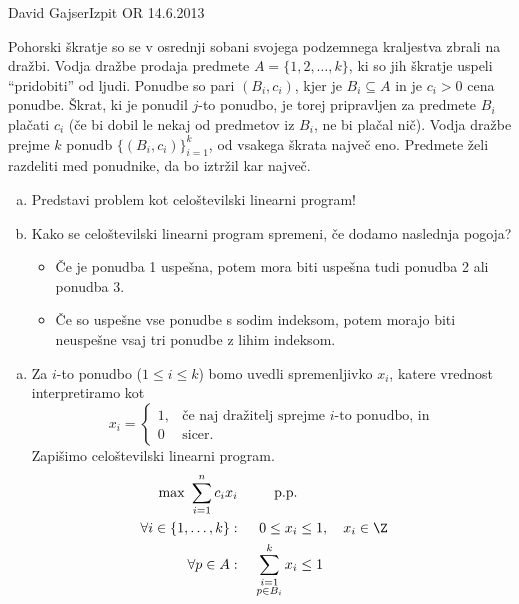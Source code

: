 \begin{naloga}%
{David Gajser}{Izpit OR 14.6.2013}
\begin{vprasanje}
Pohorski škratje so se v osrednji sobani svojega podzemnega kraljestva
zbrali na dražbi.
Vodja dražbe prodaja predmete $A = \{1, 2, \dots, k\}$,
ki so jih škratje uspeli ``pridobiti'' od ljudi.
Ponudbe so pari $(B_i, c_i)$,
kjer je $B_i \subseteq A$ in je $c_i > 0$ cena ponudbe.
Škrat, ki je ponudil $j$-to ponudbo,
je torej pripravljen za predmete $B_i$ plačati $c_i$
(če bi dobil le nekaj od predmetov iz $B_i$, ne bi plačal nič).
Vodja dražbe prejme $k$ ponudb $\{(B_i, c_i)\}_{i=1}^k$,
od vsakega škrata največ eno.
Predmete želi razdeliti med ponudnike, da bo iztržil kar največ.

\begin{enumerate}[(a)]
\item Predstavi problem kot celoštevilski linearni program!

\item Kako se celoštevilski linearni program spremeni,
če dodamo naslednja pogoja?
    \begin{itemize}
    \item Če je ponudba 1 uspešna,
    potem mora biti uspešna tudi ponudba 2 ali ponudba 3.
    \item Če so uspešne vse ponudbe s sodim indeksom,
    potem morajo biti ne\-uspeš\-ne vsaj tri ponudbe z lihim indeksom.
    \end{itemize}
\end{enumerate}
\end{vprasanje}

\begin{odgovor}
\begin{enumerate}[(a)]
\item Za $i$-to ponudbo ($1 \le i \le k$) bomo uvedli spremenljivko $x_i$,
katere vrednost interpretiramo kot
$$
x_i = \begin{cases}
1, & \text{če naj dražitelj sprejme $i$-to ponudbo, in} \\
0  & \text{sicer.}
\end{cases}
$$
Zapišimo celoštevilski linearni program.
\begin{alignat*}{2}
\max \ \sum_{i=1}^n c_i x_i && \text{p.p.} \\
\forall i \in \{1, \dots, k\}: &\ & 0 \le x_i &\le 1, \quad x_i \in \Z \\
\forall p \in A: &\ & \sum_{\substack{i=1 \\ p \in B_i}}^k x_i &\le 1
\end{alignat*}


\end{enumerate}
\end{odgovor}
\end{naloga}
